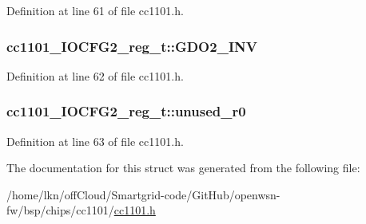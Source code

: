 Definition at line 61 of file cc1101.\+h.

\subsubsection[{\texorpdfstring{G\+D\+O2\+\_\+\+I\+NV}{GDO2_INV}}]{ cc1101\+\_\+\+I\+O\+C\+F\+G2\+\_\+reg\+\_\+t\+::\+G\+D\+O2\+\_\+\+I\+NV}\hypertarget{structcc1101___i_o_c_f_g2__reg__t_a7f874163213906db39da9b99e8a98b5d}{}\label{structcc1101___i_o_c_f_g2__reg__t_a7f874163213906db39da9b99e8a98b5d}


Definition at line 62 of file cc1101.\+h.

\subsubsection[{\texorpdfstring{unused\+\_\+r0}{unused_r0}}]{ cc1101\+\_\+\+I\+O\+C\+F\+G2\+\_\+reg\+\_\+t\+::unused\+\_\+r0}\hypertarget{structcc1101___i_o_c_f_g2__reg__t_a93dd7164de27eca2482ab65afc6d445f}{}\label{structcc1101___i_o_c_f_g2__reg__t_a93dd7164de27eca2482ab65afc6d445f}


Definition at line 63 of file cc1101.\+h.



The documentation for this struct was generated from the following file\+:\begin{DoxyCompactItemize}
\item 
/home/lkn/off\+Cloud/\+Smartgrid-\/code/\+Git\+Hub/openwsn-\/fw/bsp/chips/cc1101/\hyperlink{cc1101_8h}{cc1101.\+h}\end{DoxyCompactItemize}
